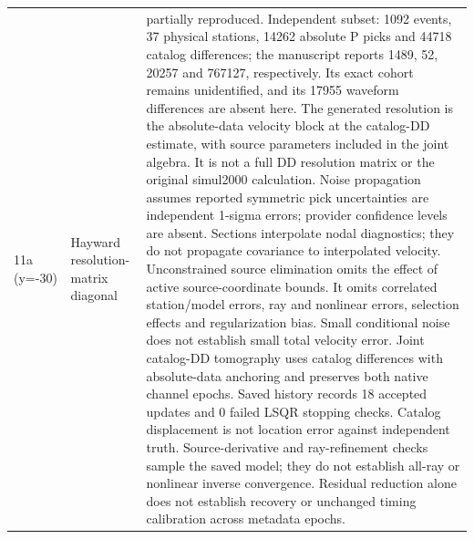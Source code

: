 \begin{longtable}{>{\raggedright\arraybackslash}p{}>{\raggedright\arraybackslash}p{}>{\raggedright\arraybackslash}p{}}
11a (y=-30) & Hayward resolution-matrix diagonal & partially reproduced. Independent subset: 1092 events, 37 physical stations, 14262 absolute P picks and 44718 catalog differences; the manuscript reports 1489, 52, 20257 and 767127, respectively. Its exact cohort remains unidentified, and its 17955 waveform differences are absent here. The generated resolution is the absolute-data velocity block at the catalog-DD estimate, with source parameters included in the joint algebra. It is not a full DD resolution matrix or the original simul2000 calculation. Noise propagation assumes reported symmetric pick uncertainties are independent 1-sigma errors; provider confidence levels are absent. Sections interpolate nodal diagnostics; they do not propagate covariance to interpolated velocity. Unconstrained source elimination omits the effect of active source-coordinate bounds. It omits correlated station/model errors, ray and nonlinear errors, selection effects and regularization bias. Small conditional noise does not establish small total velocity error. Joint catalog-DD tomography uses catalog differences with absolute-data anchoring and preserves both native channel epochs. Saved history records 18 accepted updates and 0 failed LSQR stopping checks. Catalog displacement is not location error against independent truth. Source-derivative and ray-refinement checks sample the saved model; they do not establish all-ray or nonlinear inverse convergence. Residual reduction alone does not establish recovery or unchanged timing calibration across metadata epochs.\\

\end{longtable}
